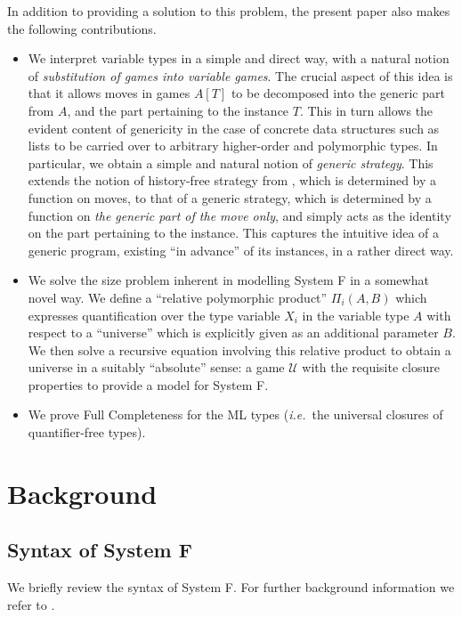 \documentclass[a4paper,11pt]{article}
\newcommand{\UU}{\mathcal{U}}
\newcommand{\ie}{\textit{i.e.}\ }
\begin{document}
In addition to providing a solution to this problem, the present paper
also makes the following contributions.
\begin{itemize}
\item We interpret variable types in a simple and direct way, with a
  natural notion of \emph{substitution of games into variable
    games}. The crucial aspect of this idea is that it allows moves in
  games $A[T]$ to be decomposed into the generic part from $A$, and
  the part pertaining to the instance $T$. This in turn allows the
  evident content of genericity in the case of concrete data
  structures such as lists to be carried over to arbitrary
  higher-order and polymorphic types. In particular, we obtain a
  simple and natural notion of \emph{generic strategy}. This extends
  the notion of history-free strategy from \cite{AJM00}, which is
  determined by a function on moves, to that of a generic strategy,
  which is determined by a function on \emph{the generic part of the move only},
and simply acts as the identity on the part pertaining to the
instance. This captures the intuitive idea of a generic program, existing ``in
advance'' of its instances, in a rather direct way.

\item We solve the size problem inherent in modelling System F in a
  somewhat novel way. We define a ``relative polymorphic product''
  $\Pi_i (A, B)$ which expresses quantification over the type variable
  $X_i$ in the variable type $A$ with respect to a ``universe'' which
  is explicitly given as an additional parameter $B$. We then solve a
  recursive equation involving this relative product to obtain a
  universe in a suitably ``absolute'' sense: a game $\UU$
  with the requisite closure properties to provide a model for System
  F.

\item We prove Full Completeness for the ML types (\ie the universal
  closures of quantifier-free types).

\end{itemize}


\section{Background}

\subsection{Syntax of System F}
We briefly review the syntax of System F. For further background
information we refer to \cite{GLT89}.
\end{document}
